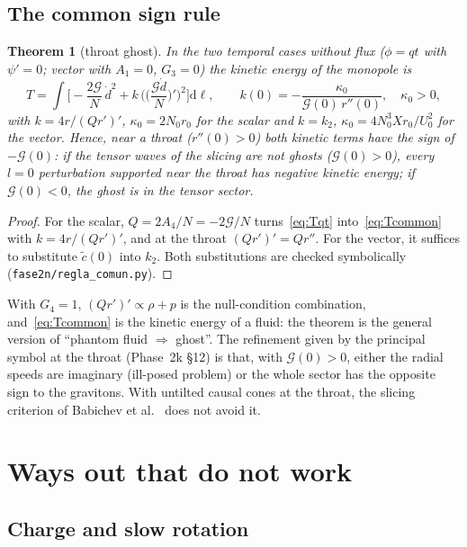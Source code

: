 \documentclass[11pt,a4paper]{article}
\newtheorem{theorem}{Theorem}
\theoremstyle{remark}
\newcommand{\G}{\mathcal G}
\newcommand{\dd}{\mathrm d}
\begin{document}
\subsection{The common sign rule}

\begin{theorem}[throat ghost]\label{thm:ghost}
In the two temporal cases without flux ($\phi=qt$ with $\psi'=0$; vector with $A_1=0$, $G_3=0$) the kinetic energy of the monopole is
\begin{equation}
T=\int\Big[-\frac{2\G}{N}\,\dot d^2+k\,\Big(\Big(\frac{\G\dot d}{N}\Big)'\Big)^2\Big]\dd\ell,\qquad k(0)=-\frac{\kappa_0}{\G(0)\,r''(0)},\quad \kappa_0>0,
\label{eq:Tcommon}
\end{equation}
with $k=4r/(Qr')'$, $\kappa_0=2N_0r_0$ for the scalar and $k=k_2$, $\kappa_0=4N_0^3Xr_0/U_0^2$ for the vector. Hence, near a throat ($r''(0)>0$) both kinetic terms have the sign of $-\G(0)$: if the tensor waves of the slicing are not ghosts ($\G(0)>0$), every $l=0$ perturbation supported near the throat has negative kinetic energy; if $\G(0)<0$, the ghost is in the tensor sector.
\end{theorem}

\begin{proof}
For the scalar, $Q=2A_4/N=-2\G/N$ turns~\eqref{eq:Tqt} into~\eqref{eq:Tcommon} with $k=4r/(Qr')'$, and at the throat $(Qr')'=Qr''$. For the vector, it suffices to substitute $\tilde c(0)$ into $k_2$. Both substitutions are checked symbolically (\texttt{fase2n/regla\_comun.py}).
\end{proof}

With $G_4=1$, $(Qr')'\propto\rho+p$ is the null-condition combination, and~\eqref{eq:Tcommon} is the kinetic energy of a fluid: the theorem is the general version of ``phantom fluid $\Rightarrow$ ghost''. The refinement given by the principal symbol at the throat (Phase~2k \S12) is that, with $\G(0)>0$, either the radial speeds are imaginary (ill-posed problem) or the whole sector has the opposite sign to the gravitons. With untilted causal cones at the throat, the slicing criterion of Babichev et al.~\cite{BCEL1,BCEL2} does not avoid it.

\section{Ways out that do not work}\label{sec:exits}

\subsection{Charge and slow rotation}
\end{document}
